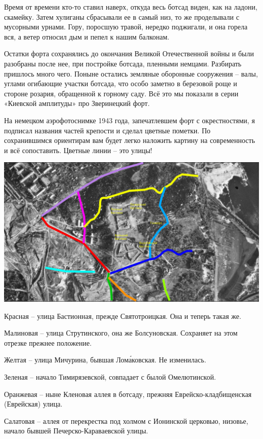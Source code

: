 Время от времени кто-то ставил наверх, откуда весь ботсад виден, как на ладони, скамейку. Затем хулиганы сбрасывали ее в самый низ, то же проделывали с мусорными урнами. Гору, поросшую травой, нередко поджигали, и она горела вся, а ветер относил дым и пепел к нашим балконам.

Остатки форта сохранялись до окончания Великой Отечественной войны и были разобраны после нее, при постройке ботсада, пленными немцами. Разбирать пришлось много чего. Поныне остались земляные оборонные сооружения – валы, углами огибающие участки ботсада, что особо заметно в березовой роще и стороне розария, обращенной к горному саду. Всё это мы показали в серии «Киевской амплитуды» про Зверинецкий форт. 

На немецком аэрофотоснимке 1943 года, запечатлевшем форт с окрестностями, я подписал названия частей крепости и сделал цветные пометки. По сохранившимся ориентирам вам будет легко наложить картину на современность и всё сопоставить. Цветные линии – это улицы!

\begin{center}
\includegraphics[width=\textwidth]{chast-vosp/zver/zver-krep-map-color.jpg}
\end{center}

Красная – улица Бастионная, прежде Святотроицкая. Она и теперь такая же.

Малиновая – улица Струтинского, она же Болсуновская. Сохраняет на этом отрезке прежнее положение.

Желтая – улица Мичурина, бывшая Лом\'аковская. Не изменилась.

Зеленая – начало Тимирязевской, совпадает с былой Омелютинской.

Оранжевая – ныне Кленовая аллея в ботсаду, прежняя Еврейско-кладбищенская (Еврейская) улица.

Салатовая – аллея от перекрестка под холмом с Ионинской церковью, низовье, начало бывшей Печерско-Кара\-ваевской улицы.

